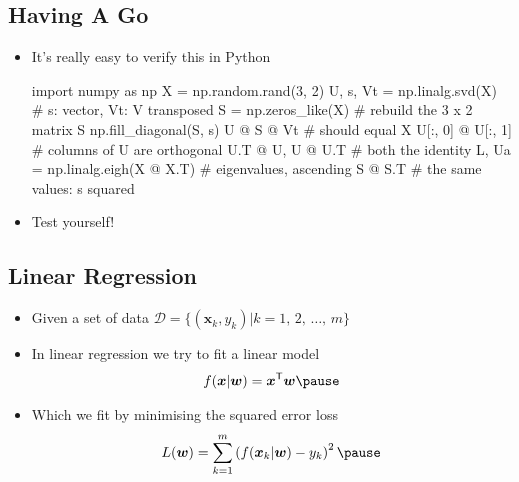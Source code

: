 \begin{slide}
\section{Having A Go}

\begin{PauseHighLight}
  \begin{itemize}
  \item It's really easy to verify this in Python\pause
\begin{python}
import numpy as np
X = np.random.rand(3, 2)
U, s, Vt = np.linalg.svd(X)     # s: vector, Vt: V transposed
S = np.zeros_like(X)            # rebuild the 3 x 2 matrix S
np.fill_diagonal(S, s)
U @ S @ Vt                      # should equal X
U[:, 0] @ U[:, 1]               # columns of U are orthogonal
U.T @ U, U @ U.T                # both the identity
L, Ua = np.linalg.eigh(X @ X.T) # eigenvalues, ascending
S @ S.T                         # the same values: s squared
\end{python}\pause
  \item Test yourself!\pause
  \end{itemize}
\end{PauseHighLight}

\end{slide}


\Outline %

\begin{slide}
\section{Linear Regression}

\begin{PauseHighLight}
  \begin{itemize}
  \item Given a set of data $\mathcal{D}= \{(\bm{x}_k, y_k)|k=1,\,2,\,\ldots,\, m\}$\pause
  \item In linear regression we try to fit a linear model
    \begin{align*}
      f(\bm{x}| \bm{w}) = \bm{x}^\tr \bm{w}\pause
    \end{align*}
  \item Which we fit by minimising the squared error loss
    \begin{align*}
      L(\bm{w}) = \sum_{k=1}^m \left(f(\bm{x}_k| \bm{w}) - y_k\right)^2\pause
    \end{align*}
  \end{itemize}
\end{PauseHighLight}

\end{slide}

